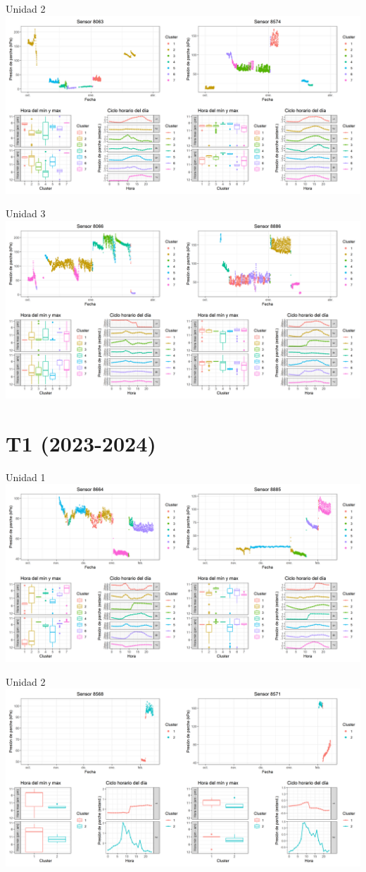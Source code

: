 \documentclass[
  letterpaper,
  DIV=11,
  numbers=noendperiod]{scrreprt}
\begin{document}
Unidad 2
\includegraphics{figuras/01_turgor_sensor/2022_2023_Rio_Claro_T4_Unidad_2.png}

Unidad 3
\includegraphics{figuras/01_turgor_sensor/2022_2023_Rio_Claro_T4_Unidad_3.png}

\chapter{T1 (2023-2024)}

Unidad 1
\includegraphics{figuras/01_turgor_sensor/2023_2024_Rio_Claro_T1_Unidad_1.png}

Unidad 2
\includegraphics{figuras/01_turgor_sensor/2023_2024_Rio_Claro_T1_Unidad_2.png}
\end{document}
